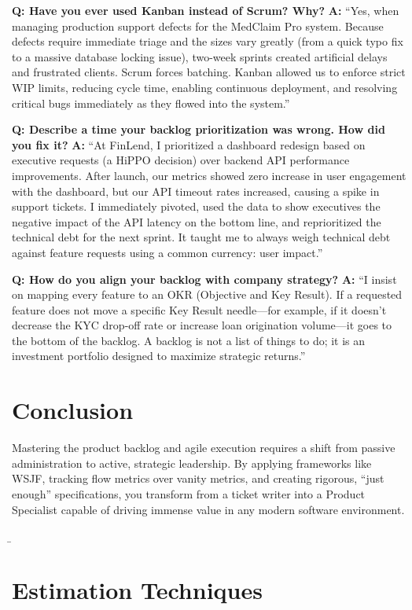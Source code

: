 \textbf{Q: Have you ever used Kanban instead of Scrum? Why?} \textbf{A:}
``Yes, when managing production support defects for the MedClaim Pro
system. Because defects require immediate triage and the sizes vary
greatly (from a quick typo fix to a massive database locking issue),
two-week sprints created artificial delays and frustrated clients. Scrum
forces batching. Kanban allowed us to enforce strict WIP limits,
reducing cycle time, enabling continuous deployment, and resolving
critical bugs immediately as they flowed into the system.''

\textbf{Q: Describe a time your backlog prioritization was wrong. How
did you fix it?} \textbf{A:} ``At FinLend, I prioritized a dashboard
redesign based on executive requests (a HiPPO decision) over backend API
performance improvements. After launch, our metrics showed zero increase
in user engagement with the dashboard, but our API timeout rates
increased, causing a spike in support tickets. I immediately pivoted,
used the data to show executives the negative impact of the API latency
on the bottom line, and reprioritized the technical debt for the next
sprint. It taught me to always weigh technical debt against feature
requests using a common currency: user impact.''

\textbf{Q: How do you align your backlog with company strategy?}
\textbf{A:} ``I insist on mapping every feature to an OKR (Objective and
Key Result). If a requested feature does not move a specific Key Result
needle---for example, if it doesn't decrease the KYC drop-off rate or
increase loan origination volume---it goes to the bottom of the backlog.
A backlog is not a list of things to do; it is an investment portfolio
designed to maximize strategic returns.''

\section{Conclusion}\label{conclusion-4}

Mastering the product backlog and agile execution requires a shift from
passive administration to active, strategic leadership. By applying
frameworks like WSJF, tracking flow metrics over vanity metrics, and
creating rigorous, ``just enough'' specifications, you transform from a
ticket writer into a Product Specialist capable of driving immense value
in any modern software environment.

\b

\section{Estimation Techniques}\label{estimation-techniques}

